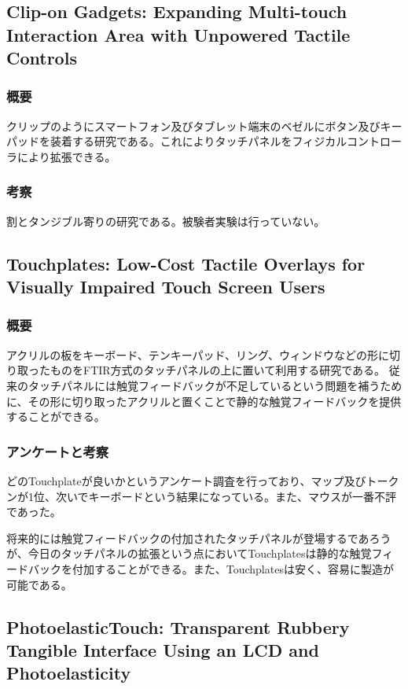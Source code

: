 \documentclass[11pt,a4paper]{jarticle}
\begin{document}
\subsection{Clip-on Gadgets: Expanding Multi-touch
Interaction Area with Unpowered Tactile Controls}
\subsubsection{概要}
クリップのようにスマートフォン及びタブレット端末のベゼルにボタン及びキーパッドを装着する研究である。これによりタッチパネルをフィジカルコントローラにより拡張できる。


\subsubsection{考察}
割とタンジブル寄りの研究である。被験者実験は行っていない。


\subsection{Touchplates: Low-Cost Tactile Overlays for Visually
Impaired Touch Screen Users}
\subsubsection{概要}
アクリルの板をキーボード、テンキーパッド、リング、ウィンドウなどの形に切り取ったものをFTIR方式のタッチパネルの上に置いて利用する研究である。
従来のタッチパネルには触覚フィードバックが不足しているという問題を補うために、その形に切り取ったアクリルと置くことで静的な触覚フィードバックを提供することができる。
\subsubsection{アンケートと考察}
どのTouchplateが良いかというアンケート調査を行っており、マップ及びトークンが1位、次いでキーボードという結果になっている。また、マウスが一番不評であった。

将来的には触覚フィードバックの付加されたタッチパネルが登場するであろうが、今日のタッチパネルの拡張という点においてTouchplatesは静的な触覚フィードバックを付加することができる。また、Touchplatesは安く、容易に製造が可能である。

\subsection{PhotoelasticTouch: Transparent Rubbery Tangible Interface Using an LCD and Photoelasticity\cite{Sato:2009}}
\end{document}
